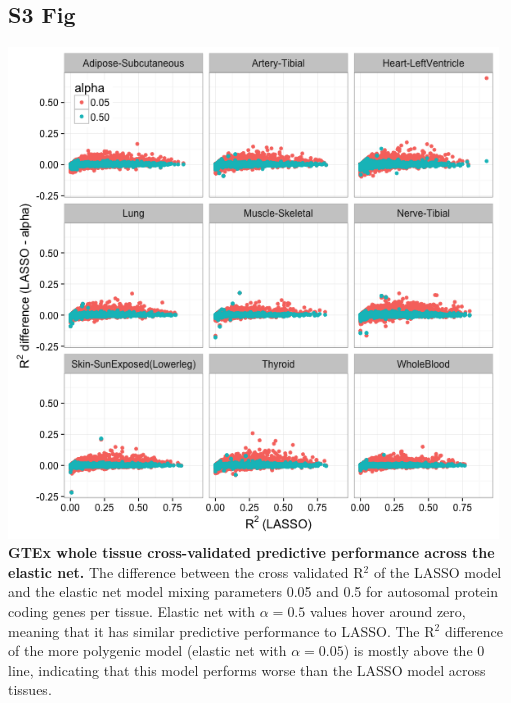 \documentclass[10pt,letterpaper]{article}
\begin{document}
\begin{singlespace}
\subsection*{S3 Fig}
\includegraphics[width=13cm]{Figures/GenArch_Supp/S2Fig.png}
\label{S3_Fig}
{\bf GTEx whole tissue cross-validated predictive performance across the elastic net.} The difference between the cross validated R$^2$ of the LASSO model and the elastic net model mixing parameters 0.05 and 0.5 for autosomal protein coding genes per tissue. Elastic net with $\alpha=0.5$ values hover around zero, meaning that it has similar predictive performance to LASSO. The R$^2$ difference of the more polygenic model (elastic net with $\alpha=0.05$) is mostly above the 0 line, indicating that this model performs worse than the LASSO model across tissues.


\end{singlespace}
\end{document}
